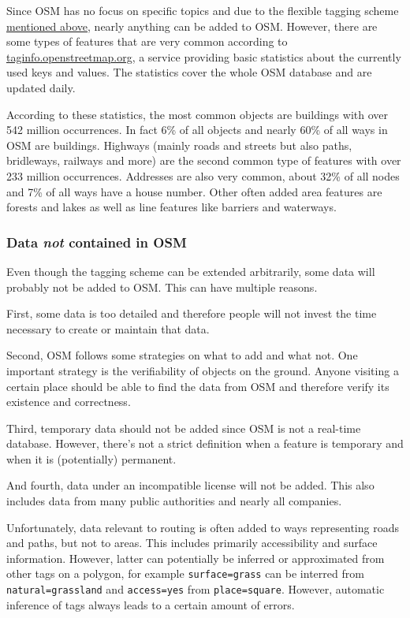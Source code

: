 			Since OSM has no focus on specific topics and due to the flexible tagging scheme \hyperref[subsubsec:osm-attributes]{mentioned above}, nearly anything can be added to OSM.
			However, there are some types of features that are very common according to \href{https://taginfo.openstreetmap.org/keys}{taginfo.openstreetmap.org}, a service providing basic statistics about the currently used keys and values\cite{taginfo-keys}.
			The statistics cover the whole OSM database and are updated daily.
			
			According to these statistics, the most common objects are buildings with over 542 million occurrences.
			In fact 6\% of all objects and nearly 60\% of all ways in OSM are buildings.
			Highways (mainly roads and streets but also paths, bridleways, railways and more) are the second common type of features with over 233 million occurrences.
			Addresses are also very common, about 32\% of all nodes and 7\% of all ways have a house number.
			Other often added area features are forests and lakes as well as line features like barriers and waterways.
			
		\subsubsection{Data \textit{not} contained in OSM}
		
			Even though the tagging scheme can be extended arbitrarily, some data will probably not be added to OSM.
			This can have multiple reasons.
			
			First, some data is too detailed and therefore people will not invest the time necessary to create or maintain that data.
			
			Second, OSM follows some strategies on what to add and what not.
			One important strategy is the verifiability of objects on the ground.
			Anyone visiting a certain place should be able to find the data from OSM and therefore verify its existence and correctness.
			
			Third, temporary data should not be added since OSM is not a real-time database.
			However, there's not a strict definition when a feature is temporary and when it is (potentially) permanent.
			
			And fourth, data under an incompatible license will not be added.
			This also includes data from many public authorities and nearly all companies.
			
			Unfortunately, data relevant to routing is often added to ways representing roads and paths, but not to areas.
			This includes primarily accessibility and surface information.
			However, latter can potentially be inferred or approximated from other tags on a polygon, for example \texttt{surface=grass} can be interred from \texttt{natural=grassland} and \texttt{access=yes} from \texttt{place=square}.
			However, automatic inference of tags always leads to a certain amount of errors.
			
